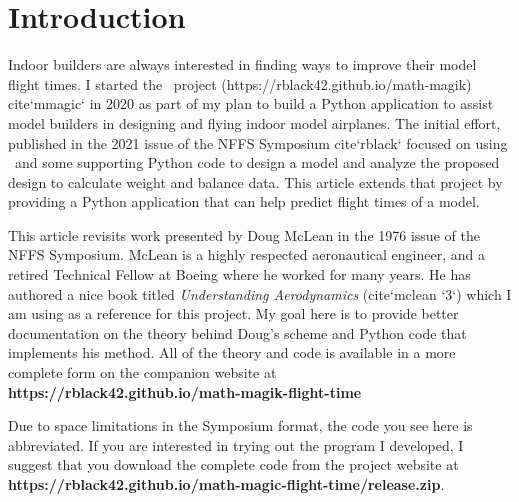 \section{Introduction}


Indoor builders are always interested in finding ways to improve their model
flight times. I started the \MM\ project
(https://rblack42.github.io/math-magik) {cite}`mmagic` in 2020 as part
of my plan to build a Python application to assist model builders in designing
and flying indoor model airplanes. The initial effort, published in the 2021
issue of the NFFS Symposium {cite}`rblack` focused on using \osc\ and some
supporting Python code to design a model and analyze the proposed design to
calculate weight and balance data. This article extends that project by
providing a Python application that can help predict flight times of a model.

This article revisits work presented by Doug McLean in the 1976 issue of the
NFFS Symposium. McLean is a highly respected aeronautical engineer, and a
retired Technical Fellow at Boeing where he worked for many years. He has
authored a nice book titled {\it Understanding Aerodynamics} ({cite}`mclean
`3`) which I am using as a reference for this project. My goal here is to
provide better documentation on the theory behind Doug's scheme and Python code
that implements his method. All of the theory and code is available in a more
complete form on the companion website at {\bf
https://rblack42.github.io/math-magik-flight-time} \cite{mmtime}

Due to space limitations in the Symposium format, the code you see here is
abbreviated. If you are interested in trying out the program I developed, I
suggest that you download the complete code from the project website at {\bf
https://rblack42.github.io/math-magic-flight-time/release.zip}.


